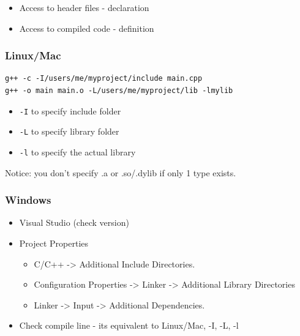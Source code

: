 \begin{itemize}
\itemsep1pt\parskip0pt
\item
  Access to header files - declaration
\item
  Access to compiled code - definition
\end{itemize}

\subsubsection{Linux/Mac}\label{linuxmac}

\begin{verbatim}
g++ -c -I/users/me/myproject/include main.cpp
g++ -o main main.o -L/users/me/myproject/lib -lmylib
\end{verbatim}

\begin{itemize}
\itemsep1pt\parskip0pt
\item
  \texttt{-I} to specify include folder
\item
  \texttt{-L} to specify library folder
\item
  \texttt{-l} to specify the actual library
\end{itemize}

Notice: you don't specify .a or .so/.dylib if only 1 type exists.

\subsubsection{Windows}\label{windows-1}

\begin{itemize}
\itemsep1pt\parskip0pt
\item
  Visual Studio (check version)
\item
  Project Properties

  \begin{itemize}
  \itemsep1pt\parskip0pt
  \item
    C/C++ -\textgreater{} Additional Include Directories.
  \item
    Configuration Properties -\textgreater{} Linker -\textgreater{}
    Additional Library Directories
  \item
    Linker -\textgreater{} Input -\textgreater{} Additional
    Dependencies.
  \end{itemize}
\item
  Check compile line - its equivalent to Linux/Mac, -I, -L, -l
\end{itemize}

